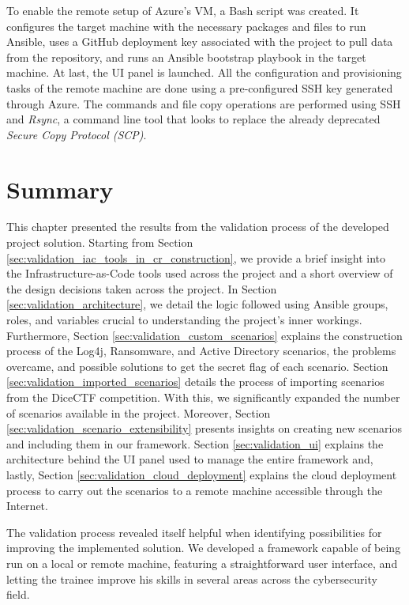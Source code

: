To enable the remote setup of Azure's VM, a Bash script was created. It configures the target machine with the necessary packages and files to run Ansible, uses a GitHub deployment key associated with the project to pull data from the repository, and runs an Ansible bootstrap playbook in the target machine. At last, the UI panel is launched. All the configuration and provisioning tasks of the remote machine are done using a pre-configured SSH key generated through Azure. The commands and file copy operations are performed using SSH and \textit{Rsync}, a command line tool that looks to replace the already deprecated \textit{Secure Copy Protocol (SCP)}.


\section{Summary} \label{sec:validation_summary}

This chapter presented the results from the validation process of the developed project solution. Starting from Section \ref{sec:validation_iac_tools_in_cr_construction}, we provide a brief insight into the Infrastructure-as-Code tools used across the project and a short overview of the design decisions taken across the project. In Section \ref{sec:validation_architecture}, we detail the logic followed using Ansible groups, roles, and variables crucial to understanding the project's inner workings. Furthermore, Section \ref{sec:validation_custom_scenarios} explains the construction process of the Log4j, Ransomware, and Active Directory scenarios, the problems overcame, and possible solutions to get the secret flag of each scenario. Section \ref{sec:validation_imported_scenarios} details the process of importing scenarios from the DiceCTF competition. With this, we significantly expanded the number of scenarios available in the project. Moreover, Section \ref{sec:validation_scenario_extensibility} presents insights on creating new scenarios and including them in our framework. Section \ref{sec:validation_ui} explains the architecture behind the UI panel used to manage the entire framework and, lastly, Section \ref{sec:validation_cloud_deployment} explains the cloud deployment process to carry out the scenarios to a remote machine accessible through the Internet.

The validation process revealed itself helpful when identifying possibilities for improving the implemented solution. We developed a framework capable of being run on a local or remote machine, featuring a straightforward user interface, and letting the trainee improve his skills in several areas across the cybersecurity field.